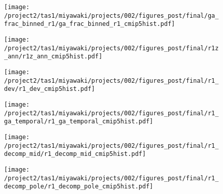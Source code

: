 \documentclass{ametsocV5}
\begin{document}
\begin{figure}[t]
  \noindent\texttt{[image: /project2/tas1/miyawaki/projects/002/figures\_post/final/ga\_frac\_binned\_r1/ga\_frac\_binned\_r1\_cmip5hist.pdf]}\\
  \label{fig:cmip5-binned-r1}
\end{figure}

\begin{figure}[t]
  \noindent\texttt{[image: /project2/tas1/miyawaki/projects/002/figures\_post/final/r1z\_ann/r1z\_ann\_cmip5hist.pdf]}\\
  \label{fig:cmip5hist-r1-ann}
\end{figure}

\begin{figure}[t]
  \centering
  \noindent\texttt{[image: /project2/tas1/miyawaki/projects/002/figures\_post/final/r1\_dev/r1\_dev\_cmip5hist.pdf]}\\
  \label{fig:cmip5hist-r1-dev}
\end{figure}

\begin{figure}[t]
  \noindent\texttt{[image: /project2/tas1/miyawaki/projects/002/figures\_post/final/r1\_ga\_temporal/r1\_ga\_temporal\_cmip5hist.pdf]}\\
  \label{fig:cmip5hist-r1-ga-temporal}
\end{figure}

\begin{figure}[t]
  \noindent\texttt{[image: /project2/tas1/miyawaki/projects/002/figures\_post/final/r1\_decomp\_mid/r1\_decomp\_mid\_cmip5hist.pdf]}\\
  \label{fig:cmip5hist-r1-decomp-mid}
\end{figure}

\begin{figure}[t]
  \noindent\texttt{[image: /project2/tas1/miyawaki/projects/002/figures\_post/final/r1\_decomp\_pole/r1\_decomp\_pole\_cmip5hist.pdf]}\\
  \label{fig:cmip5hist-r1-decomp-pole}
\end{figure}
\end{document}
